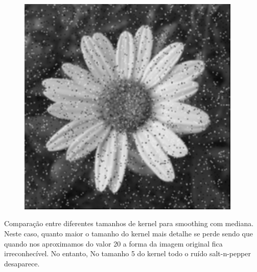 \documentclass[a4paper]{report}
\begin{document}
\begin{figure}[H]
\begin{minipage}{.3\textwidth}
\end{minipage}%
\begin{minipage}{.3\textwidth}
  \centering
  \includegraphics[width=0.95\textwidth]{images/Smooth/spatial-salt-n-pepper/flower_smooth_spatial_gaussian_20_2.png}
\end{minipage}
\end{figure}

Comparação entre diferentes tamanhos de kernel para smoothing com mediana. Neste caso, quanto maior o tamanho do kernel
mais detalhe se perde sendo que quando nos aproximamos do valor 20 a forma da imagem original fica irreconhecível. No
entanto, No tamanho 5 do kernel todo o ruído salt-n-pepper desaparece.
\end{document}
